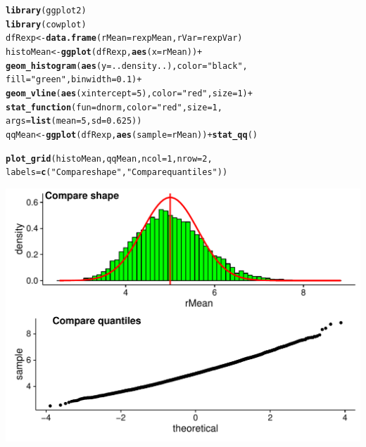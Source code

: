 \documentclass[a4paper, 10pt]{article}\usepackage[]{graphicx}\usepackage[]{color}
\makeatletter
\def\maxwidth{ %
  \ifdim\Gin@nat@width>\linewidth
    \linewidth
  \else
    \Gin@nat@width
  \fi
}
\newcommand{\hlnum}[1]{\textcolor[rgb]{0.686,0.059,0.569}{#1}}%
\newcommand{\hlstr}[1]{\textcolor[rgb]{0.192,0.494,0.8}{#1}}%
\newcommand{\hlopt}[1]{\textcolor[rgb]{0,0,0}{#1}}%
\newcommand{\hlstd}[1]{\textcolor[rgb]{0.345,0.345,0.345}{#1}}%
\newcommand{\hlkwb}[1]{\textcolor[rgb]{0.69,0.353,0.396}{#1}}%
\newcommand{\hlkwc}[1]{\textcolor[rgb]{0.333,0.667,0.333}{#1}}%
\newcommand{\hlkwd}[1]{\textcolor[rgb]{0.737,0.353,0.396}{\textbf{#1}}}%
\newenvironment{kframe}{%
 \def\at@end@of@kframe{}%
 \ifinner\ifhmode%
  \def\at@end@of@kframe{\end{minipage}}%
  \begin{minipage}{\columnwidth}%
 \fi\fi%
 \def\FrameCommand##1{\hskip\@totalleftmargin \hskip-\fboxsep
 \colorbox{shadecolor}{##1}\hskip-\fboxsep
     \hskip-\linewidth \hskip-\@totalleftmargin \hskip\columnwidth}%
 \MakeFramed {\advance\hsize-\width
   \@totalleftmargin\z@ \linewidth\hsize
   \@setminipage}}%
 {\par\unskip\endMakeFramed%
 \at@end@of@kframe}
\newenvironment{knitrout}{}{} %
\makeatother
\begin{document}
\begin{knitrout}\small
{}\color{fgcolor}\begin{kframe}
\begin{alltt}
\hlkwd{library}\hlstd{(ggplot2)}
\hlkwd{library}\hlstd{(cowplot)}
\hlstd{dfRexp}  \hlkwb{<-} \hlkwd{data.frame}\hlstd{(}\hlkwc{rMean}\hlstd{=rexpMean,} \hlkwc{rVar}\hlstd{=rexpVar)}
\hlstd{histoMean} \hlkwb{<-} \hlkwd{ggplot}\hlstd{(dfRexp,} \hlkwd{aes}\hlstd{(}\hlkwc{x}\hlstd{=rMean))} \hlopt{+}
    \hlkwd{geom_histogram}\hlstd{(}\hlkwd{aes}\hlstd{(}\hlkwc{y}\hlstd{=..density..),} \hlkwc{color}\hlstd{=}\hlstr{"black"}\hlstd{,}
                   \hlkwc{fill}\hlstd{=}\hlstr{"green"}\hlstd{,} \hlkwc{binwidth}\hlstd{=}\hlnum{0.1}\hlstd{)} \hlopt{+}
    \hlkwd{geom_vline}\hlstd{(}\hlkwd{aes}\hlstd{(}\hlkwc{xintercept}\hlstd{=}\hlnum{5}\hlstd{),} \hlkwc{color}\hlstd{=}\hlstr{"red"}\hlstd{,} \hlkwc{size}\hlstd{=}\hlnum{1}\hlstd{)} \hlopt{+}
    \hlkwd{stat_function}\hlstd{(}\hlkwc{fun}\hlstd{=dnorm,} \hlkwc{color}\hlstd{=}\hlstr{"red"}\hlstd{,} \hlkwc{size}\hlstd{=}\hlnum{1}\hlstd{,}
                  \hlkwc{args}\hlstd{=}\hlkwd{list}\hlstd{(}\hlkwc{mean}\hlstd{=}\hlnum{5}\hlstd{,} \hlkwc{sd}\hlstd{=}\hlnum{0.625}\hlstd{))}
\hlstd{qqMean} \hlkwb{<-} \hlkwd{ggplot}\hlstd{(dfRexp,} \hlkwd{aes}\hlstd{(}\hlkwc{sample}\hlstd{=rMean))} \hlopt{+} \hlkwd{stat_qq}\hlstd{()}

\hlkwd{plot_grid}\hlstd{(histoMean, qqMean,} \hlkwc{ncol}\hlstd{=}\hlnum{1}\hlstd{,} \hlkwc{nrow}\hlstd{=}\hlnum{2}\hlstd{,}
          \hlkwc{labels}\hlstd{=}\hlkwd{c}\hlstd{(}\hlstr{"Compare shape"}\hlstd{,}\hlstr{"Compare quantiles"}\hlstd{))}
\end{alltt}
\end{kframe}
\includegraphics[width=\maxwidth]{figure/plot-1} 

\end{knitrout}
\end{document}
